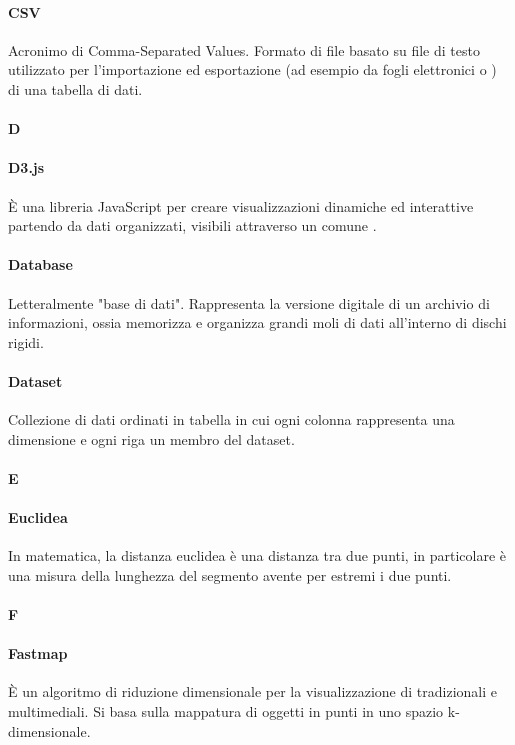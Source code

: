 \paragraph*{CSV}
Acronimo di Comma-Separated Values. Formato di file basato su file di testo utilizzato per l'importazione ed esportazione (ad esempio da fogli elettronici o ) di una tabella di dati.

\paragraph*{D}

\paragraph*{D3.js}
È una libreria JavaScript per creare visualizzazioni dinamiche ed interattive partendo da dati organizzati, visibili attraverso un comune .


\paragraph*{Database}
Letteralmente "base di dati". Rappresenta la versione digitale di un archivio di informazioni, ossia memorizza e organizza grandi moli di dati all'interno di dischi rigidi.

\paragraph*{Dataset}
Collezione di dati ordinati in tabella in cui ogni colonna rappresenta una dimensione e ogni riga un membro del dataset.

\paragraph*{E}

\paragraph*{Euclidea}
In matematica, la distanza euclidea è una distanza tra due punti, in particolare è una misura della lunghezza del segmento avente per estremi i due punti.

\paragraph*{F}

\paragraph*{Fastmap}
È un algoritmo di riduzione dimensionale per la visualizzazione di  tradizionali e multimediali. Si basa sulla mappatura di oggetti in punti in uno spazio k-dimensionale.

